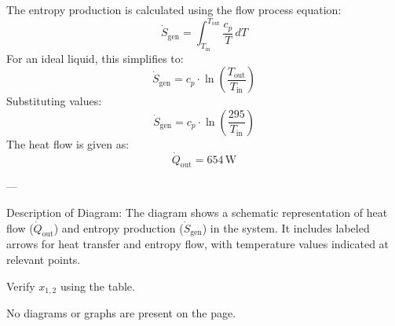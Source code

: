 The entropy production is calculated using the flow process equation:  
\[
\dot{S}_{\text{gen}} = \int_{T_{\text{in}}}^{T_{\text{out}}} \frac{c_p}{T} \, dT
\]  
For an ideal liquid, this simplifies to:  
\[
\dot{S}_{\text{gen}} = c_p \cdot \ln\left(\frac{T_{\text{out}}}{T_{\text{in}}}\right)
\]  
Substituting values:  
\[
\dot{S}_{\text{gen}} = c_p \cdot \ln\left(\frac{295}{T_{\text{in}}}\right)
\]  
The heat flow is given as:  
\[
\dot{Q}_{\text{out}} = 654 \, \text{W}
\]  

---

Description of Diagram:  
The diagram shows a schematic representation of heat flow (\( \dot{Q}_{\text{out}} \)) and entropy production (\( \dot{S}_{\text{gen}} \)) in the system. It includes labeled arrows for heat transfer and entropy flow, with temperature values indicated at relevant points.

Verify \( x_{1,2} \) using the table.  

No diagrams or graphs are present on the page.